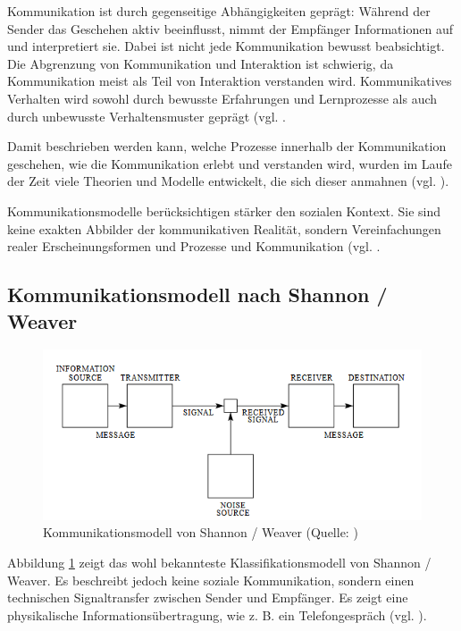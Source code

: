 Kommunikation ist durch gegenseitige Abhängigkeiten geprägt: Während der Sender das Geschehen aktiv beeinflusst, nimmt der Empfänger Informationen auf und interpretiert sie. Dabei ist nicht jede Kommunikation bewusst beabsichtigt. Die Abgrenzung von Kommunikation und Interaktion ist schwierig, da Kommunikation meist als Teil von Interaktion verstanden wird. Kommunikatives Verhalten wird sowohl durch bewusste Erfahrungen und Lernprozesse als auch durch unbewusste Verhaltensmuster geprägt (vgl. \cite[S. 20]{becker_praxishandbuch_2018}.

Damit beschrieben werden kann, welche Prozesse innerhalb der Kommunikation geschehen, wie die Kommunikation erlebt und verstanden wird, wurden im Laufe der Zeit viele Theorien und Modelle entwickelt, die sich dieser anmahnen (vgl. \cite[S. 311]{schwarz_grundlagen_2019}).

Kommunikationsmodelle berücksichtigen stärker den sozialen Kontext. Sie sind keine exakten Abbilder der kommunikativen Realität, sondern Vereinfachungen realer Erscheinungsformen und Prozesse und Kommunikation (vgl. \cite[S. 56]{maletzke_kommunikationswissenschaft_1998}.

\subsection{Kommunikationsmodell nach Shannon / Weaver}

\begin{figure}[ht]
\centering
\includegraphics[width=1\linewidth]{content/pictures/shannon-weaver.PNG}
\caption{Kommunikationsmodell von Shannon / Weaver (Quelle: \cite[S. 2]{shannon_mathematical_1948})}
\label{fig:shannon-weaver-modell}
\end{figure}

Abbildung \ref{fig:shannon-weaver-modell} zeigt das wohl bekannteste Klassifikationsmodell von Shannon / Weaver. Es beschreibt jedoch keine soziale Kommunikation, sondern einen technischen Signaltransfer zwischen Sender und Empfänger. Es zeigt eine physikalische Informationsübertragung, wie z. B. ein Telefongespräch (vgl. \cite[S. 92]{scheufele_kommunikationstheorien_2004}). 

